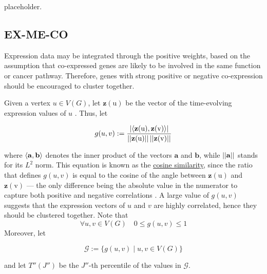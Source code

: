 placeholder. 

\subsection{EX-ME-CO}

Expression data may be integrated through the positive weights, based on the assumption that co-expressed genes are likely to be involved in the same function or cancer pathway. Therefore, genes with strong positive or negative co-expression should be encouraged to cluster together.

Given a vertex $u \in V(G)$, let $\mathrm {\mathbf z(u)}$ be the vector of the time-evolving expression values of $u$ . Thus, let

\begin{equation}
    g(u, v) := \dfrac{\left|\left\langle\mathrm{\mathbf z(u)}, \mathrm{\mathbf z(v)}\right\rangle\right|}{\left|\left|\mathrm{\mathbf z(u)}\right|\right| \left|\left|\mathrm{\mathbf z(v)}\right|\right|}
\end{equation}

where $\left\langle\mathrm{\mathbf a}, \mathrm{\mathbf b}\right\rangle$ denotes the inner product of the vectors $\mathrm{\mathbf a}$ and $\mathrm{\mathbf b}$, while $\left|\left|\mathrm{\mathbf a}\right|\right|$ stands for its $L^2$ norm. This equation is known as the \href{https://en.wikipedia.org/wiki/Cosine_similarity}{cosine similarity}, since the ratio that defines $g(u, v)$ is equal to the cosine of the angle between $\mathrm {\mathbf z(u)}$ and $\mathrm {\mathbf z(v)}$ --- the only difference being the absolute value in the numerator to capture both positive and negative correlations . A large value of $g(u, v)$ suggests that the expression vectors of $u$ and $v$ are highly correlated, hence they should be clustered together. Note that $$\forall u, v \in V(G) \quad 0 \le g(u, v) \le 1$$ Moreover, let

\begin{equation}
    \mathscr G := \{g(u, v) \mid u, v \in V(G)\}
\end{equation}

and let $T''(J'')$ be the $J''$-th percentile of the values in $\mathscr G$.


